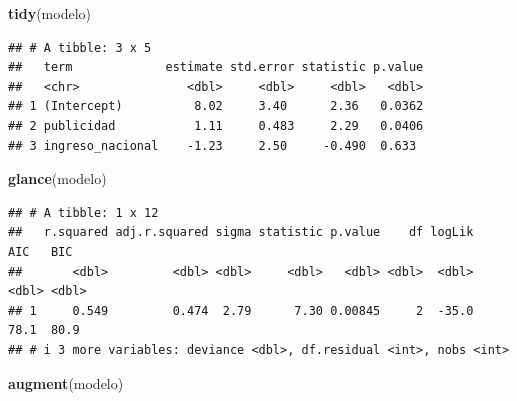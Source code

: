 \documentclass[
]{book}
\newenvironment{Shaded}{\begin{snugshade}}{\end{snugshade}}
\newcommand{\FunctionTok}[1]{\textcolor[rgb]{0.13,0.29,0.53}{\textbf{#1}}}
\newcommand{\NormalTok}[1]{#1}
\begin{document}
\begin{Shaded}
\begin{Highlighting}[]
\FunctionTok{tidy}\NormalTok{(modelo)}
\end{Highlighting}
\end{Shaded}

\begin{verbatim}
## # A tibble: 3 x 5
##   term             estimate std.error statistic p.value
##   <chr>               <dbl>     <dbl>     <dbl>   <dbl>
## 1 (Intercept)          8.02     3.40      2.36   0.0362
## 2 publicidad           1.11     0.483     2.29   0.0406
## 3 ingreso_nacional    -1.23     2.50     -0.490  0.633
\end{verbatim}

\begin{Shaded}
\begin{Highlighting}[]
\FunctionTok{glance}\NormalTok{(modelo)}
\end{Highlighting}
\end{Shaded}

\begin{verbatim}
## # A tibble: 1 x 12
##   r.squared adj.r.squared sigma statistic p.value    df logLik   AIC   BIC
##       <dbl>         <dbl> <dbl>     <dbl>   <dbl> <dbl>  <dbl> <dbl> <dbl>
## 1     0.549         0.474  2.79      7.30 0.00845     2  -35.0  78.1  80.9
## # i 3 more variables: deviance <dbl>, df.residual <int>, nobs <int>
\end{verbatim}

\begin{Shaded}
\begin{Highlighting}[]
\FunctionTok{augment}\NormalTok{(modelo)}
\end{Highlighting}
\end{Shaded}
\end{document}
